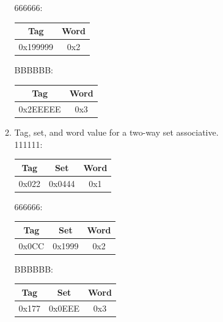 \documentclass[12pt]{article}
\begin{document}
\begin{enumerate}
\begin{enumerate}
            666666: 
            \begin{tabular}{|c|c|}
                \hline
                Tag & Word \\
                \hline
                0x199999 & 0x2 \\
                \hline
            \end{tabular}

            BBBBBB: 
            \begin{tabular}{|c|c|}
                \hline
                Tag & Word \\
                \hline
                0x2EEEEE& 0x3 \\
                \hline
            \end{tabular}
        \item Tag, set, and word value for a two-way set associative. \\
            111111: 
            \begin{tabular}{|c|c|c|}
                \hline
                Tag & Set & Word \\
                \hline
                0x022 & 0x0444 & 0x1 \\
                \hline
            \end{tabular}

            666666: 
            \begin{tabular}{|c|c|c|}
                \hline
                Tag & Set & Word \\
                \hline
                0x0CC & 0x1999 & 0x2 \\
                \hline
            \end{tabular}

            BBBBBB: 
            \begin{tabular}{|c|c|c|}
                \hline
                Tag & Set & Word \\
                \hline
                0x177 & 0x0EEE & 0x3 \\
                \hline
            \end{tabular}
    \end{enumerate}


\end{enumerate}
\end{document}

